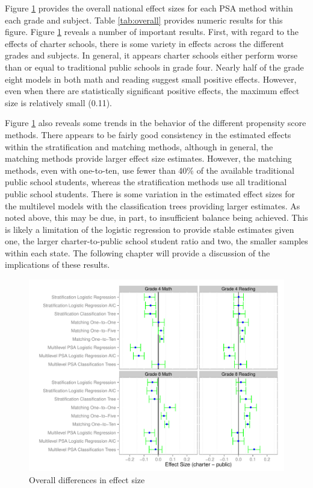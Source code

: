 \documentclass[letterpaper,12p,twoside]{article} %
\begin{document}
Figure \ref{fig:overalldiff} provides the overall national effect sizes for each PSA method within each grade and subject. Table \ref{tab:overall} provides numeric results for this figure. Figure \ref{fig:overalldiff} reveals a number of important results. First, with regard to the effects of charter schools, there is some variety in effects across the different grades and subjects. In general, it appears charter schools either perform worse than or equal to traditional public schools in grade four. Nearly half of the grade eight models in both math and reading suggest small positive effects. However, even when there are statistically significant positive effects, the maximum effect size is relatively small (0.11). 


Figure \ref{fig:overalldiff} also reveals some trends in the behavior of the different propensity score methods. There appears to be fairly good consistency in the estimated effects within the stratification and matching methods, although in general, the matching methods provide larger effect size estimates. However, the matching methods, even with one-to-ten, use fewer than 40\% of the available traditional public school students, whereas the stratification methods use all traditional public school students. There is some variation in the estimated effect sizes for the multilevel models with the classification trees providing larger estimates. As noted above, this may be due, in part, to insufficient balance being achieved. This is likely a limitation of the logistic regression to provide stable estimates given one, the larger charter-to-public school student ratio and two, the smaller samples within each state. The following chapter will provide a discussion of the implications of these results.

\begin{figure}[t]
\begin{center}
\includegraphics[width=\textwidth]{../Figures2009/Overall.pdf}
\caption{Overall differences in effect size}
\label{fig:overalldiff}
\end{center}
\end{figure}
\end{document}
